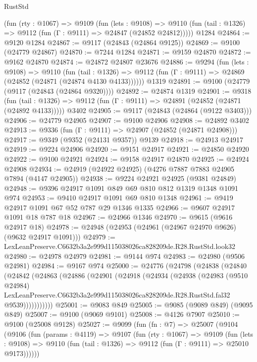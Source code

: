\begin{lexlean}{RustStd}
\begin{coremodule}
    (fun (rty : @1067) =>
    @9109
      (fun (lets : @9108) =>
      @9110 (fun (tail : @1326) => @9112 (fun (Γ : @9111) => @24847 (@24852 @24812)))))
    @1284
@24864 := @9120 @1284
@24867 := @9117 (@24843 (@24864 @9125))
@24869 := @9100 (@24779 @24867)
@24870 := @7244 @1284
@24871 := @9159 @24870
@24872 := @9162 @24870
@24874 := @24872 @24807 @23676
@24886 := @9294
    (fun (lets : @9108) =>
    @9110
      (fun (tail : @1326) =>
      @9112 (fun (Γ : @9111) => @24869 (@24852 (@24871 (@24874 @4130 @4133))))))
    @1319
@24891 := @9100 (@24779 (@9117 (@24843 (@24864 @9320))))
@24892 := @24874 @1319
@24901 := @9318
    (fun (tail : @1326) => @9112 (fun (Γ : @9111) => @24891 (@24852 (@24871 (@24892 @4133)))))
    @3402
@24905 := @9117 (@24843 (@24864 (@9122 @3403)))
@24906 := @24779 @24905
@24907 := @9100 @24906
@24908 := @24892 @3402
@24913 := @9336 (fun (Γ : @9111) => @24907 (@24852 (@24871 @24908)))
@24917 := @9349 (@9352 (@24131 @9357)) @9139
@24918 := @24913 @24917
@24919 := @9224 @24906
@24920 := @9151 @24917
@24921 := @24850 @24920
@24922 := @9100 @24921
@24924 := @9158 @24917 @24870
@24925 := @24924 @24908
@24934 := @24919 (@24922 @24925) (@4276 @7887 @7883 @24905 @7894 (@4147 @24905))
@24938 := @9224 @24921 @24925 (@9381 @24849)
@24948 := @9396 @24917 @1091 @849 @69 @810 @812 @1319 @1348 @1091 @974
@24953 := @9410 @24917 @1091 @69 @810 @1348
@24961 := @9419 @24917 @1091 @67 @52 @787 @29 @1346 @1335
@24966 := @9607 @24917 @1091 @18 @787 @18
@24967 := @24966 @1346
@24970 := @9615 (@9616 @24917 @18)
@24978 := @24948 (@24953 (@24961 (@24967 @24970 @9626) (@9632 @24917 @1091)))
@24979 := LexLeanPreserve.C6632b3a2e999d115038026ca828209de.R28.RustStd.look32
@24980 := @24978 @24979
@24981 := @9144 @974
@24983 := @24980 (@9506 @24981)
@24984 := @9167 @974
@25000 := @24776
    (@24798
      (@24838
        (@24840
          (@24842
            (@24863
              (@24886
                (@24901
                  (@24918
                    (@24934
                      (@24938
                        (@24983
                          (@9510 @24984)
                          LexLeanPreserve.C6632b3a2e999d115038026ca828209de.R28.RustStd.fal32
                          @9539)))))))))))
@25001 := @9083 @849
@25005 := @9085 (@9089 @849) (@9095 @849)
@25007 := @9100 (@9069 @9101)
@25008 := @4126 @7907
@25010 := @9100 (@25008 @9128)
@25027 := @9099
    (fun (fn : @7) =>
    @25007
      (@9104
        (@9106
          (fun (params : @4119) =>
          @9107
            (fun (rty : @1067) =>
            @9109
              (fun (lets : @9108) =>
              @9110 (fun (tail : @1326) => @9112 (fun (Γ : @9111) => @25010 @9173))))))

\end{coremodule}
\end{lexlean}
